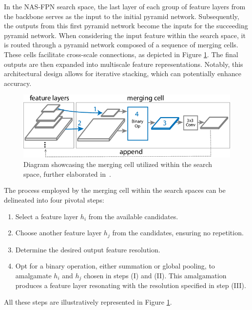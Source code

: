 In the NAS-FPN search space, the last layer of each group of feature layers from the backbone serves as the input to the initial pyramid network. Subsequently, the outputs from this first pyramid network become the inputs for the succeeding pyramid network. When considering the input feature within the search space, it is routed through a pyramid network composed of a sequence of merging cells. These cells facilitate cross-scale connections, as depicted in Figure \ref{fig:nas-merge-cell}. The final outputs are then expanded into multiscale feature representations. Notably, this architectural design allows for iterative stacking, which can potentially enhance accuracy.

\begin{figure}[htb]
    \centering
    \includegraphics[width=0.6\linewidth]{figures/chapters-imgs/30/nas-merge-cell.png}
    \caption{Diagram showcasing the merging cell utilized within the search space, further elaborated in~\cite{DBLP:journals/corr/abs-1904-07392}.}
    \label{fig:nas-merge-cell}
\end{figure}

The process employed by the merging cell within the search spaces can be delineated into four pivotal steps:
\begin{enumerate}[label=(\Roman*)]
    \item Select a feature layer \( h_i \) from the available candidates.
    \item Choose another feature layer \( h_j \) from the candidates, ensuring no repetition.
    \item Determine the desired output feature resolution.
    \item Opt for a binary operation, either summation or global pooling, to amalgamate \( h_i \) and \( h_j \) chosen in steps (I) and (II). This amalgamation produces a feature layer resonating with the resolution specified in step (III).
\end{enumerate}
All these steps are illustratively represented in Figure \ref{fig:nas-merge-cell}.\\


